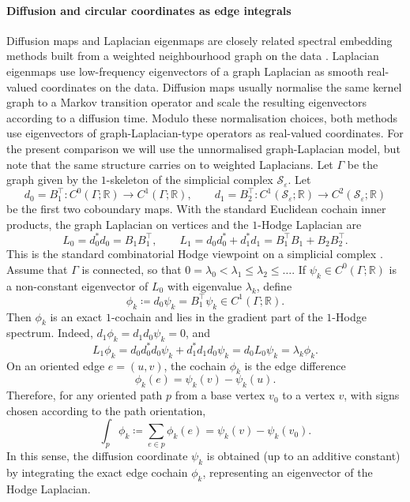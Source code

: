 \documentclass[a4paper,11pt, DIV=10]{scrartcl}
\numberwithin{equation}{section}
\theoremstyle{definition}
\theoremstyle{remark}
\newcommand{\R}{\mathbb{R}}
\newcommand{\mc}[1]{\mathcal{#1}}
\begin{document}
\paragraph{Diffusion and circular coordinates as edge integrals}
Diffusion maps and Laplacian eigenmaps are closely related spectral embedding methods built from a weighted neighbourhood graph on the data \cite{coifman2006diffusion,belkin2003laplacian}.
Laplacian eigenmaps use low-frequency eigenvectors of a graph Laplacian as smooth real-valued coordinates on the data.
Diffusion maps usually normalise the same kernel graph to a Markov transition operator and scale the resulting eigenvectors according to a diffusion time.
Modulo these normalisation choices, both methods use eigenvectors of graph-Laplacian-type operators as real-valued coordinates.
For the present comparison we will use the unnormalised graph-Laplacian model, but note that the same structure carries on to weighted Laplacians.
Let $\Gamma$ be the graph given by the $1$-skeleton of the simplicial complex $\mc{S}_\varepsilon$.
Let
\[
d_0=B_1^\top\colon C^0(\Gamma;\R)\to C^1(\Gamma;\R),
\qquad
d_1=B_2^\top\colon C^1(\mc{S}_\varepsilon;\R)\to C^2(\mc{S}_\varepsilon;\R)
\]
be the first two coboundary maps.
With the standard Euclidean cochain inner products, the graph Laplacian on vertices and the $1$-Hodge Laplacian are
\[
L_0=d_0^*d_0=B_1B_1^\top,
\qquad
L_1=d_0d_0^*+d_1^*d_1=B_1^\top B_1+B_2B_2^\top.
\]
This is the standard combinatorial Hodge viewpoint on a simplicial complex \cite{Eckmann:1944}.
Assume that $\Gamma$ is connected, so that $0=\lambda_0<\lambda_1\leq\lambda_2\leq\dots$.
If $\psi_k\in C^0(\Gamma;\R)$ is a non-constant eigenvector of $L_0$ with eigenvalue $\lambda_k$, define
\[
\phi_k\coloneq d_0\psi_k=B_1^\top\psi_k\in C^1(\Gamma;\R).
\]
Then $\phi_k$ is an exact $1$-cochain and lies in the gradient part of the $1$-Hodge spectrum.
Indeed, $d_1\phi_k=d_1d_0\psi_k=0$, and
\[
L_1\phi_k
=d_0d_0^*d_0\psi_k+d_1^*d_1d_0\psi_k
=d_0L_0\psi_k
=\lambda_k\phi_k.
\]
On an oriented edge $e=(u,v)$, the cochain $\phi_k$ is the edge difference
\[
\phi_k(e)=\psi_k(v)-\psi_k(u).
\]
Therefore, for any oriented path $p$ from a base vertex $v_0$ to a vertex $v$, with signs chosen according to the path orientation,
\[
\int_p\phi_k\coloneq \sum_{e\in p}\phi_k(e)=\psi_k(v)-\psi_k(v_0).
\]
In this sense, the diffusion coordinate $\psi_k$ is obtained (up to an additive constant) by integrating the exact edge cochain $\phi_k$, representing an eigenvector of the Hodge Laplacian.
\end{document}
